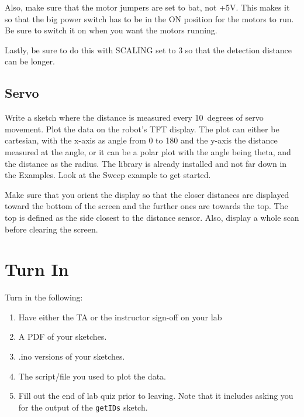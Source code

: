 Also, make sure that the motor jumpers are set to bat, not +5V. This makes it so that 
the big power switch has to be in the ON position for the motors to run. Be sure to 
switch it on when you want the motors running. 

Lastly, be sure to do this with SCALING set to 3 so that the detection distance can 
be longer.

\subsection{Servo}
Write a sketch where the distance is measured every 10~degrees of servo movement. Plot the
data on the robot's TFT display. The plot can either be cartesian, with the x-axis as angle
from 0 to 180 and the y-axis the distance measured at the angle, or it can be a polar plot 
with the angle being theta, and the distance as the radius. The \lstinline@Servo@ library 
is already installed and not far down in the Examples. Look at the Sweep example to get started.

Make sure that you orient the display so that the closer distances are displayed toward the
bottom of the screen and the further ones are towards the top. The top is defined as the 
side closest to the distance sensor. Also, display a whole scan before clearing the screen.


\section{Turn In}
Turn in the following:
\begin{enumerate}
    \item Have either the TA or the instructor sign-off on your lab
    \item A PDF of your sketches.
    \item .ino versions of your sketches.
    \item The script/file you used to plot the data.
    \item Fill out the end of lab quiz prior to leaving. Note that it includes asking you 
            for the output of the \lstinline$getIDs$ sketch. 
\end{enumerate}

